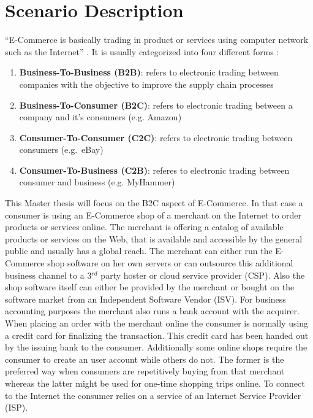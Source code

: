 
\section{Scenario Description}
\label{sec:scenario_description}

``E-Commerce is basically trading in product or services using computer network such as the Internet'' \citep{sen2015study}.
It is usually categorized into four different forms \citep{sen2015study}:\@

\begin{enumerate}
  \item \textbf{Business-To-Business (B2B)}: refers to electronic trading between companies with the objective to improve the supply chain processes
  \item \textbf{Business-To-Consumer (B2C)}: refers to electronic trading between a company and it's consumers (e.g. Amazon)
  \item \textbf{Consumer-To-Consumer (C2C)}: refers to electronic trading between consumers (e.g.\ eBay)
  \item \textbf{Consumer-To-Business (C2B)}: referes to electronic trading between consumer and business (e.g. MyHammer)
\end{enumerate}

This Master thesis will focus on the B2C aspect of E-Commerce. In that case a consumer is using an E-Commerce shop of a merchant on the Internet to
order products or services online. The merchant is offering a catalog of available products or services on the Web, that is available and accessible
by the general public and usually has a global reach. The merchant can either run the E-Commerce shop software on her own servers or can outsource this additional business channel to a 3$^{rd}$ party hoster or cloud
service provider (CSP). Also the shop software itself can either be provided by the merchant or bought on the software market from an Independent Software Vendor (ISV).
For business accounting purposes the merchant also runs a bank account with the acquirer. \\
When placing an order with the merchant online the consumer is normally using a credit card for finalizing the transaction. This credit card has been handed out by the issuing bank to the consumer.
Additionally some online shops require the consumer to create an user account while others do not. The former is the preferred way when consumers are repetitively buying from that merchant
whereas the latter might be used for one-time shopping trips online. To connect to the Internet the consumer relies on a service of an Internet Service Provider (ISP). \\

